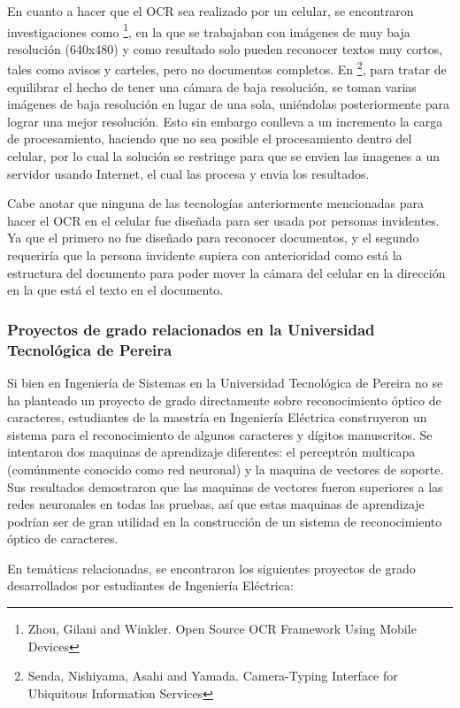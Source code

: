 \documentclass[a4paper, 11pt, oneside]{article}
\begin{document}
	En cuanto a hacer que el OCR sea realizado por un celular, se encontraron investigaciones
	como \footnote{Zhou, Gilani and Winkler. Open Source OCR Framework Using Mobile Devices}, 
	en la que se trabajaban con imágenes de muy baja resolución (640x480) y como resultado solo
    pueden reconocer textos muy cortos, tales como avisos y carteles, pero no documentos completos.
	En \footnote{Senda, Nishiyama, Asahi and Yamada. Camera-Typing Interface for Ubiquitous
	Information Services}, para tratar de equilibrar el hecho de tener una cámara de baja
	resolución, se toman varias imágenes de baja resolución en lugar de una sola, uniéndolas
	posteriormente para lograr una mejor resolución. Esto sin embargo conlleva a un incremento la
	carga de procesamiento, haciendo que no sea posible el procesamiento dentro del celular,
	por lo cual la solución se restringe para que se envien las imagenes a un servidor usando 
    Internet, el cual las procesa y envia los resultados.

	Cabe anotar que ninguna de las tecnologías anteriormente mencionadas para hacer
	el OCR en el celular fue diseñada para ser usada por personas invidentes. Ya que el 
	primero no fue diseñado para reconocer documentos, y el segundo requeriría que la persona
	invidente supiera con anterioridad como está la estructura del documento para poder mover
	la cámara del celular en la dirección en la que está el texto en el documento.
	
	\subsubsection{Proyectos de grado relacionados en la Universidad Tecnológica de Pereira}
	Si bien en Ingeniería de Sistemas en la Universidad Tecnológica de Pereira no se ha planteado un 
    proyecto de grado directamente sobre reconocimiento óptico de caracteres, estudiantes de la 
    maestría en Ingeniería Eléctrica construyeron un sistema para el reconocimiento de algunos 
    caracteres y dígitos manuscritos. Se intentaron dos maquinas de aprendizaje diferentes:
	el perceptrón multicapa (comúnmente conocido como red neuronal) y la maquina de vectores de
	soporte. Sus resultados demostraron que las maquinas de vectores fueron superiores a las redes
    neuronales en todas las pruebas, así que estas maquinas de aprendizaje podrían ser de gran 
    utilidad en la construcción de un sistema de reconocimiento óptico de caracteres.
    
	En temáticas relacionadas, se encontraron los siguientes proyectos de grado desarrollados por 
    estudiantes de Ingeniería Eléctrica:
    
\end{document}
